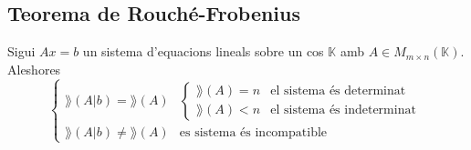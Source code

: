 \documentclass[../Apunts.tex]{subfiles}
\begin{document}
	\subsection{Teorema de Rouché-Frobenius}
	\begin{theorem}
		Sigui \(Ax=b\) un sistema d'equacions lineals sobre un cos \(\mathbb{K}\) amb \(A\in M_{m\times n}(\mathbb{K})\). Aleshores%
		\[\begin{cases}
		\rang(A\vert b)=\rang(A) & \begin{cases}
		\rang(A)=n & \text{el sistema és determinat} \\
		\rang(A)<n & \text{el sistema és indeterminat}
		\end{cases} \\
		\rang(A\vert b)\neq\rang(A) & \text{es sistema és incompatible}
		\end{cases}\]
	\end{theorem}
%
%	
%	
%
\end{document}

